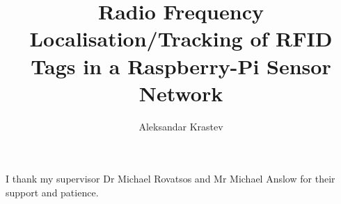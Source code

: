 \documentclass[msc, cs, deptreport, singlespacing, twoside]{infthesis}
\title{Radio Frequency Localisation/Tracking of RFID Tags in a Raspberry-Pi Sensor Network}
\author{Aleksandar Krastev}
\begin{document}
\begin{preliminary}
\maketitle

\begin{acknowledgements}
I thank my supervisor Dr Michael Rovatsos and Mr Michael Anslow for their support and patience.
\end{acknowledgements}

\standarddeclaration

\tableofcontents
\end{preliminary}








\appendix




\end{document}
